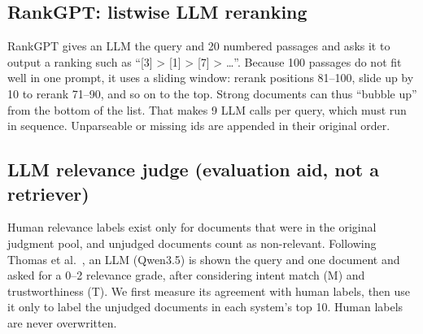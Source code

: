 \subsection{RankGPT: listwise LLM reranking~\cite{sun2023rankgpt}}
RankGPT gives an LLM the query and 20 numbered passages and asks it to output a ranking such as
``[3] > [1] > [7] > \dots''. Because 100 passages do not fit well in one prompt, it uses a sliding
window: rerank positions 81--100, slide up by 10 to rerank 71--90, and so on to the top. Strong
documents can thus ``bubble up'' from the bottom of the list. That makes 9 LLM calls per query, which
must run in sequence. Unparseable or missing ids are appended in their original order.
\begin{center}\end{center}

\subsection{LLM relevance judge (evaluation aid, not a retriever)}
Human relevance labels exist only for documents that were in the original judgment pool, and
unjudged documents count as non-relevant. Following Thomas et al.~\cite{thomas2024llmjudge}, an LLM (Qwen3.5) is shown the
query and one document and asked for a 0--2 relevance grade, after considering intent match (M) and
trustworthiness (T). We first measure its agreement with human labels, then use it only to label
the unjudged documents in each system's top 10. Human labels are never overwritten.
\begin{center}\end{center}
